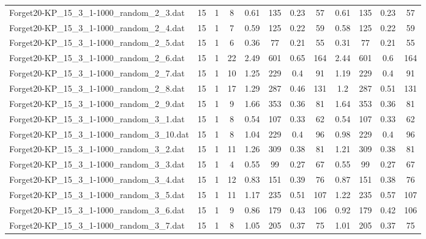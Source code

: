 \begin{sidewaystable}[!ht]
{\begin{tabular}{lccccccccccc}
Forget20-KP\_15\_3\_1-1000\_random\_2\_3.dat & 15 & 1 & 8 & 0.61 & 135 &  \textcolor{blue2}{0.23} & 57 & 0.61 & 135 &  \textcolor{blue2}{0.23} & 57 \\
Forget20-KP\_15\_3\_1-1000\_random\_2\_4.dat & 15 & 1 & 7 & 0.59 & 125 &  \textcolor{blue2}{0.22} & 59 & 0.58 & 125 &  \textcolor{blue2}{0.22} & 59 \\
Forget20-KP\_15\_3\_1-1000\_random\_2\_5.dat & 15 & 1 & 6 & 0.36 & 77 &  \textcolor{blue2}{0.21} & 55 & 0.31 & 77 &  \textcolor{blue2}{0.21} & 55 \\
Forget20-KP\_15\_3\_1-1000\_random\_2\_6.dat & 15 & 1 & 22 & 2.49 & 601 & 0.65 & 164 & 2.44 & 601 &  \textcolor{blue2}{0.6} & 164 \\
Forget20-KP\_15\_3\_1-1000\_random\_2\_7.dat & 15 & 1 & 10 & 1.25 & 229 &  \textcolor{blue2}{0.4} & 91 & 1.19 & 229 &  \textcolor{blue2}{0.4} & 91 \\
Forget20-KP\_15\_3\_1-1000\_random\_2\_8.dat & 15 & 1 & 17 & 1.29 & 287 &  \textcolor{blue2}{0.46} & 131 & 1.2 & 287 & 0.51 & 131 \\
Forget20-KP\_15\_3\_1-1000\_random\_2\_9.dat & 15 & 1 & 9 & 1.66 & 353 &  \textcolor{blue2}{0.36} & 81 & 1.64 & 353 &  \textcolor{blue2}{0.36} & 81 \\
Forget20-KP\_15\_3\_1-1000\_random\_3\_1.dat & 15 & 1 & 8 & 0.54 & 107 &  \textcolor{blue2}{0.33} & 62 & 0.54 & 107 &  \textcolor{blue2}{0.33} & 62 \\
Forget20-KP\_15\_3\_1-1000\_random\_3\_10.dat & 15 & 1 & 8 & 1.04 & 229 &  \textcolor{blue2}{0.4} & 96 & 0.98 & 229 &  \textcolor{blue2}{0.4} & 96 \\
Forget20-KP\_15\_3\_1-1000\_random\_3\_2.dat & 15 & 1 & 11 & 1.26 & 309 &  \textcolor{blue2}{0.38} & 81 & 1.21 & 309 &  \textcolor{blue2}{0.38} & 81 \\
Forget20-KP\_15\_3\_1-1000\_random\_3\_3.dat & 15 & 1 & 4 & 0.55 & 99 &  \textcolor{blue2}{0.27} & 67 & 0.55 & 99 &  \textcolor{blue2}{0.27} & 67 \\
Forget20-KP\_15\_3\_1-1000\_random\_3\_4.dat & 15 & 1 & 12 & 0.83 & 151 & 0.39 & 76 & 0.87 & 151 &  \textcolor{blue2}{0.38} & 76 \\
Forget20-KP\_15\_3\_1-1000\_random\_3\_5.dat & 15 & 1 & 11 & 1.17 & 235 &  \textcolor{blue2}{0.51} & 107 & 1.22 & 235 & 0.57 & 107 \\
Forget20-KP\_15\_3\_1-1000\_random\_3\_6.dat & 15 & 1 & 9 & 0.86 & 179 & 0.43 & 106 & 0.92 & 179 &  \textcolor{blue2}{0.42} & 106 \\
Forget20-KP\_15\_3\_1-1000\_random\_3\_7.dat & 15 & 1 & 8 & 1.05 & 205 &  \textcolor{blue2}{0.37} & 75 & 1.01 & 205 &  \textcolor{blue2}{0.37} & 75 \\

\end{tabular}}
\end{sidewaystable}

